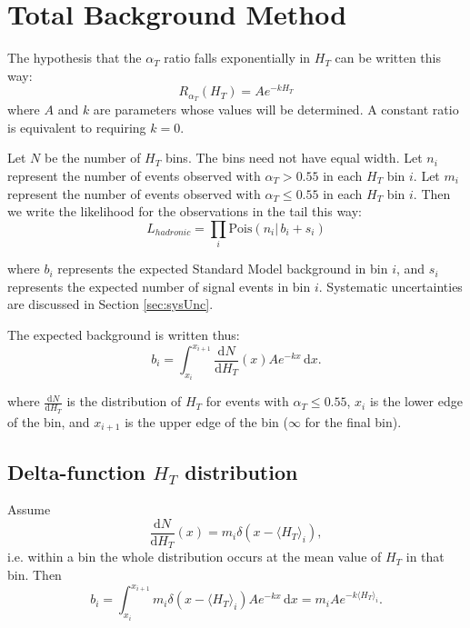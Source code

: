 \section{Total Background Method}
The hypothesis that the $\alpha_{T}$ ratio falls exponentially in $H_T$ can be written this way:
\begin{equation}
R_{\alpha_{T}}(H_T) = A e^{-k H_T}
\end{equation}
where $A$ and $k$ are parameters whose values will be determined.  A constant ratio is equivalent to requiring $k=0$.

Let $N$ be the number of $H_T$ bins.  The bins need not have equal width.
Let $n_i$ represent the number of events observed with $\alpha_{T} > 0.55$ in each $H_T$ bin $i$.
Let $m_i$ represent the number of events observed with $\alpha_{T} \le 0.55$ in each $H_T$ bin $i$.
Then we write the likelihood for the observations in the tail this way:
\begin{equation}
L_{hadronic}=\prod_i \mathrm{Pois}(n_i |\, b_i + s_i)
\end{equation}

where $b_i$ represents the expected Standard Model background in bin $i$, 
and $s_i$ represents the expected number of signal events in bin $i$.
Systematic uncertainties are discussed in Section \ref{sec:sysUnc}.

The expected background is written thus:
\begin{equation}
b_i = \int_{x_i}^{x_{i+1}}\! \frac{\mathrm{d}N}{\mathrm{d}H_T}(x) A e^{-k x}\, \mathrm{d}x.
\end{equation}

where $\frac{\mathrm{d}N}{\mathrm{d}H_T}$ is the distribution of $H_T$ for events with $\alpha_{T} \le 0.55$,
$x_i$ is the lower edge of the bin, and $x_{i+1}$ is the upper edge of the bin ($\infty$ for the final bin).

\subsection{Delta-function $H_T$ distribution}
\label{sec:diracDeltaHt}
Assume
\begin{equation}
\frac{\mathrm{d}N}{\mathrm{d}H_T}(x) = m_{i}\delta(x-\langle H_T \rangle_i),
\end{equation}
i.e. within a bin the whole distribution occurs at the mean value of $H_T$ in that bin.
Then
\begin{equation}
b_i = \int_{x_i}^{x_{i+1}}\! m_{i}\delta(x-\langle H_T \rangle_i) Ae^{-kx}\, \mathrm{d}x = m_{i} Ae^{-k \langle H_T \rangle_i}.
\label{eq:biDirac}
\end{equation}

